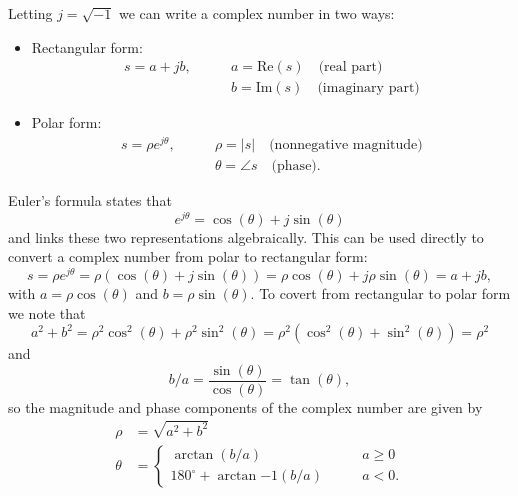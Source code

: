 \documentclass[10pt]{beamer}
\begin{document}
Letting $j = \sqrt{-1}$ we can write a complex number in two ways:
\begin{itemize}
\item Rectangular form:  
\begin{align*}
  s = a + jb, \qquad & a = \text{Re}(s) \quad \text{(real part)} \\
  & b = \text{Im}(s) \quad \text{(imaginary part)}
\end{align*}
\item Polar form:
\begin{align*}
  s = \rho e^{j \theta}, \qquad & \rho = |s| \quad \text{(nonnegative magnitude)} \\
  & \theta = \angle s \quad \text{(phase)}.
\end{align*}
\end{itemize}

Euler's formula states that
\begin{equation*}
  e^{j \theta} = \cos(\theta) + j \sin(\theta)
\end{equation*}
and links these two representations algebraically.  This can be used directly to convert a complex number from polar to rectangular form:
\begin{equation*}
  s = \rho e^{j \theta} = \rho (\cos(\theta) + j \sin(\theta))
  = \rho \cos(\theta) + j \rho \sin(\theta) = a + j b,
\end{equation*}
with $a = \rho \cos(\theta)$ and $b = \rho \sin(\theta)$.  To covert from rectangular to polar form we note that
\begin{equation*}
  a^2 + b^2 = \rho^2 \cos^2(\theta) + \rho^2 \sin^2(\theta) = \rho^2 (\cos^2(\theta) + \sin^2(\theta)) = \rho^2
\end{equation*}
and 
\begin{equation*}
  b/a = \frac{\sin(\theta)}{\cos(\theta)} = \tan(\theta),
\end{equation*}
so the magnitude and phase components of the complex number are given by
\begin{align*}
  \rho &= \sqrt{a^2 + b^2} \\
  \theta &= \begin{cases}
    \arctan(b/a) \qquad & a \geq 0 \\
    180^\circ + \arctan{-1}(b/a) \qquad & a < 0.
  \end{cases}
\end{align*}
\end{document}
